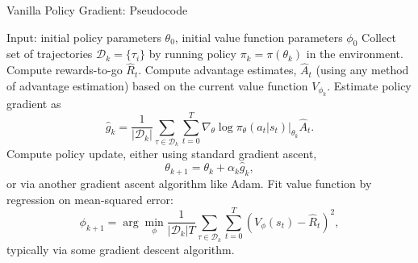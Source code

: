 \documentclass[9pt]{beamer}
\begin{document}
\begin{frame}{Vanilla Policy Gradient: Pseudocode}
    \begin{algorithm}[H]
        \caption{Vanilla Policy Gradient Algorithm}
        \label{alg1}
    \begin{algorithmic}[1]
    \footnotesize{
        \STATE Input: initial policy parameters $\theta_0$, initial value function parameters $\phi_0$
        \STATE Collect set of trajectories ${\mathcal D}_k = \{\tau_i\}$ by running policy $\pi_k = \pi(\theta_k)$ in the environment.
        \STATE Compute rewards-to-go $\hat{R}_t$.
        \STATE Compute advantage estimates, $\hat{A}_t$ (using any method of advantage estimation) based on the current value function $V_{\phi_k}$.
        \STATE Estimate policy gradient as
            \begin{equation*}
            \hat{g}_k = \frac{1}{|{\mathcal D}_k|} \sum_{\tau \in {\mathcal D}_k} \sum_{t=0}^T \left. \nabla_{\theta} \log\pi_{\theta}(a_t|s_t)\right|_{\theta_k} \hat{A}_t.
            \end{equation*}
        \STATE Compute policy update, either using standard gradient ascent,
            \begin{equation*}
            \theta_{k+1} = \theta_k + \alpha_k \hat{g}_k,
            \end{equation*}
            or via another gradient ascent algorithm like Adam.
        \STATE Fit value function by regression on mean-squared error:
            \begin{equation*}
            \phi_{k+1} = \arg \min_{\phi} \frac{1}{|{\mathcal D}_k| T} \sum_{\tau \in {\mathcal D}_k} \sum_{t=0}^T\left( V_{\phi} (s_t) - \hat{R}_t \right)^2,
            \end{equation*}
            typically via some gradient descent algorithm.
        \ENDFOR
        }
    \end{algorithmic}
    \end{algorithm}
\end{frame}
\end{document}
